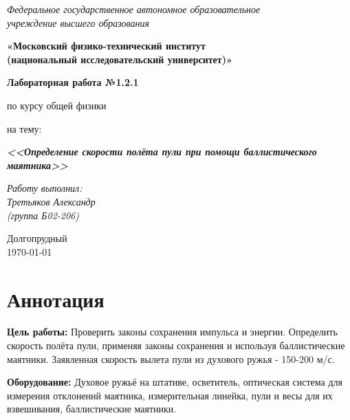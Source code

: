 \documentclass[a4paper,14pt]{extarticle}
\begin{document}
	\begin{center}
		\textit{Федеральное государственное автономное образовательное\\ учреждение высшего образования }
		
		\vspace{0.5ex}
		
		\textbf{«Московский физико-технический институт\\ (национальный исследовательский университет)»}
	\end{center}
	
	\vspace{10ex}
	
	
	\begin{center}
		\vspace{13ex}
		
		\textbf{Лабораторная работа №1.2.1}
		
		\vspace{1ex}
		
		по курсу общей физики
		
		на тему:
		
		\textbf{\textit{<<Определение скорости полёта пули при помощи баллистического маятника>>}}
		
		\vspace{30ex}
		
		\begin{flushright}
			\noindent
			\textit{Работу выполнил:}\\  
			\textit{Третьяков Александр \\(группа Б02-206)}
		\end{flushright}
		\vfill
		Долгопрудный \\ \today
		
	\end{center}
	
	\section{Аннотация}
	
	\textbf{Цель работы:}
	Проверить законы сохранения импульса и энергии.
	Определить скорость полёта пули, применяя законы сохранения и используя баллистические маятники.
	\newline Заявленная скорость вылета пули из духового ружья - 150-200 м/с.
	
	\noindent\textbf{Оборудование:}
	Духовое ружьё на штативе, осветитель, оптическая система для измерения отклонений маятника, измерительная линейка, пули и весы для их взвешивания, баллистические маятники.
	\newcommand{\RomanNumeralCaps}[1]
	{\MakeUppercase{\romannumeral #1}}
\end{document}
